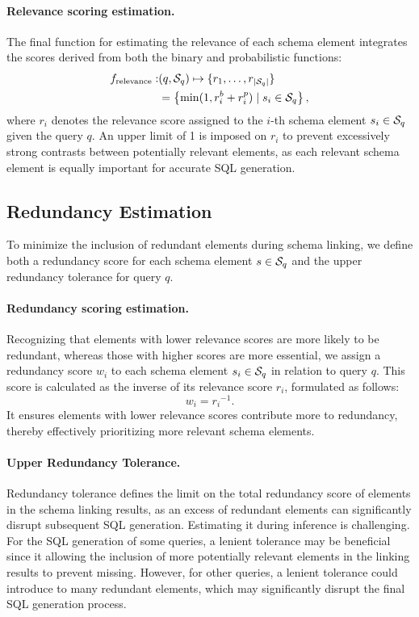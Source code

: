 \paragraph{Relevance scoring estimation.}
The final function for estimating the relevance of each schema element integrates the scores derived from both the binary and probabilistic functions:
\begin{equation}\label{Relevance scoring estimation}
\begin{split}
    f_{\text{relevance}}:& (q, {\mathcal{S}}_q) \mapsto \{r_1, \ldots, r_{|{\mathcal{S}}_q|}\} \\
    & = \left\{\min(1, r^b_i + r^p_i) \mid s_i \in {\mathcal{S}}_q \right\},
\end{split}
\end{equation}
where $r_i$ denotes the relevance score assigned to the $i$-th schema element $s_i \in {\mathcal{S}}_q$ given the query $q$. An upper limit of 1 is imposed on $r_i$ to prevent excessively strong contrasts between potentially relevant elements, as each relevant schema element is equally important for accurate SQL generation.


\subsection{Redundancy Estimation}
To minimize the inclusion of redundant elements during schema linking, we define both a redundancy score for each schema element $s \in {\mathcal{S}}_q$ and the upper redundancy tolerance for query $q$.

\paragraph{Redundancy scoring estimation.}
Recognizing that elements with lower relevance scores are more likely to be redundant, whereas those with higher scores are more essential, we assign a redundancy score $w_i$ to each schema element $s_i \in {\mathcal{S}}_q$ in relation to query $q$. This score is calculated as the inverse of its relevance score $r_i$, formulated as follows:
\begin{equation}
w_i = {r_i}^{-1}.
\end{equation}
It ensures elements with lower relevance scores contribute more to redundancy, thereby effectively prioritizing more relevant schema elements.

\paragraph{Upper Redundancy Tolerance.}
Redundancy tolerance defines the limit on the total redundancy score of elements in the schema linking results, as an excess of redundant elements can significantly disrupt subsequent SQL generation. Estimating it during inference is challenging. For the SQL generation of some queries, a lenient tolerance may be beneficial since it allowing the inclusion of more potentially relevant elements in the linking results to prevent missing. However, for other queries, a lenient tolerance could introduce to many redundant elements, which may significantly disrupt the final SQL generation process.

